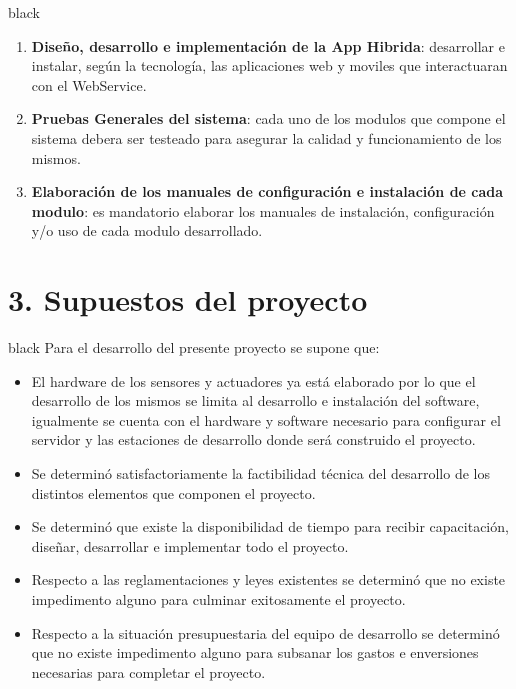 \documentclass[11pt]{charter}
\begin{document}
\begin{consigna}{black}
\begin{enumerate}
	\item \textbf{Diseño, desarrollo e implementación de la App Hibrida}: desarrollar e instalar, según la tecnología, las aplicaciones web y moviles que interactuaran con el WebService.
	\item \textbf{Pruebas Generales del sistema}: cada uno de los modulos que compone el sistema debera ser testeado para asegurar la calidad y funcionamiento de los mismos.
	\item \textbf{Elaboración de los manuales de configuración e instalación de cada modulo}: es mandatorio elaborar los manuales de instalación, configuración y/o uso de cada modulo desarrollado.
\end{enumerate}
\end{consigna}

\section{3. Supuestos del proyecto}
\label{sec:supuestos}

\begin{consigna}{black}
Para el desarrollo del presente proyecto se supone que: 

\begin{itemize}
	\item El hardware de los sensores y actuadores ya está elaborado por lo que el desarrollo de los mismos se limita al desarrollo e instalación del software, igualmente se cuenta con el hardware y software necesario para configurar el servidor y las estaciones de desarrollo donde será construido  el proyecto.
	\item Se determinó satisfactoriamente la factibilidad técnica del desarrollo de los distintos elementos que componen el proyecto.
	\item Se determinó que existe la disponibilidad de tiempo para recibir capacitación, diseñar, desarrollar e implementar todo el proyecto.
	\item Respecto a las reglamentaciones y leyes existentes se determinó que no existe impedimento alguno para culminar exitosamente el proyecto.
	\item Respecto a la situación presupuestaria del equipo de desarrollo se determinó que no existe impedimento alguno para subsanar los gastos e enversiones necesarias para completar el proyecto.
\end{itemize}
%
\end{consigna}
\end{document}
